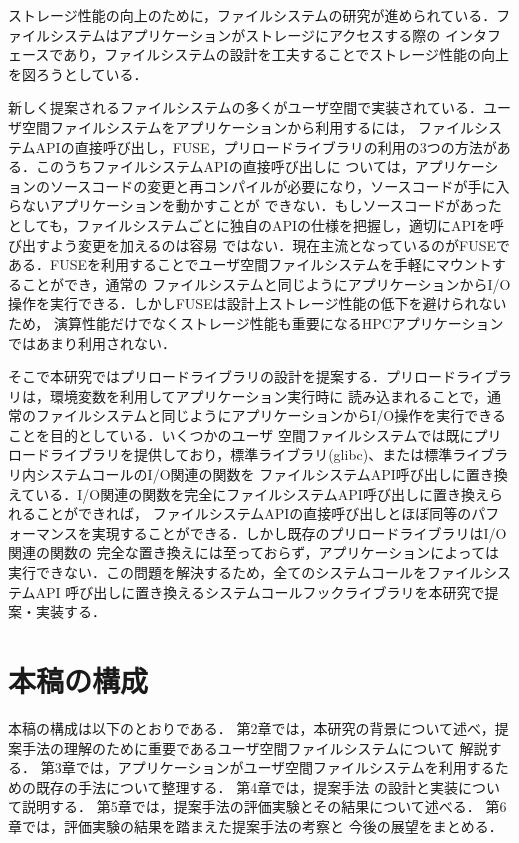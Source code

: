 \documentclass[a4paper,11pt]{jreport}
\begin{document}
ストレージ性能の向上のために，ファイルシステムの研究が進められている．ファイルシステムはアプリケーションがストレージにアクセスする際の
インタフェースであり，ファイルシステムの設計を工夫することでストレージ性能の向上を図ろうとしている． 

新しく提案されるファイルシステムの多くがユーザ空間で実装されている．ユーザ空間ファイルシステムをアプリケーションから利用するには，
ファイルシステムAPIの直接呼び出し，FUSE，プリロードライブラリの利用の3つの方法がある．このうちファイルシステムAPIの直接呼び出しに
ついては，アプリケーションのソースコードの変更と再コンパイルが必要になり，ソースコードが手に入らないアプリケーションを動かすことが
できない．もしソースコードがあったとしても，ファイルシステムごとに独自のAPIの仕様を把握し，適切にAPIを呼び出すよう変更を加えるのは容易
ではない．現在主流となっているのがFUSEである．FUSEを利用することでユーザ空間ファイルシステムを手軽にマウントすることができ，通常の
ファイルシステムと同じようにアプリケーションからI/O操作を実行できる．しかしFUSEは設計上ストレージ性能の低下を避けられないため，
演算性能だけでなくストレージ性能も重要になるHPCアプリケーションではあまり利用されない．

そこで本研究ではプリロードライブラリの設計を提案する．プリロードライブラリは，環境変数を利用してアプリケーション実行時に
読み込まれることで，通常のファイルシステムと同じようにアプリケーションからI/O操作を実行できることを目的としている．いくつかのユーザ
空間ファイルシステムでは既にプリロードライブラリを提供しており，標準ライブラリ(glibc)、または標準ライブラリ内システムコールのI/O関連の関数を
ファイルシステムAPI呼び出しに置き換えている．I/O関連の関数を完全にファイルシステムAPI呼び出しに置き換えられることができれば，
ファイルシステムAPIの直接呼び出しとほぼ同等のパフォーマンスを実現することができる．しかし既存のプリロードライブラリはI/O関連の関数の
完全な置き換えには至っておらず，アプリケーションによっては実行できない．この問題を解決するため，全てのシステムコールをファイルシステムAPI
呼び出しに置き換えるシステムコールフックライブラリを本研究で提案・実装する．
\section{本稿の構成}
本稿の構成は以下のとおりである． 第2章では，本研究の背景について述べ，提案手法の理解のために重要であるユーザ空間ファイルシステムについて
解説する． 第3章では，アプリケーションがユーザ空間ファイルシステムを利用するための既存の手法について整理する． 第4章では，提案手法
の設計と実装について説明する． 第5章では，提案手法の評価実験とその結果について述べる． 第6章では，評価実験の結果を踏まえた提案手法の考察と
今後の展望をまとめる．
\end{document}
